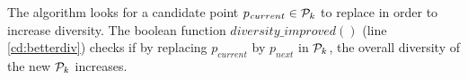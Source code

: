 \vspace{2pt}
The algorithm looks for a candidate point $p_{\mathit current} \in {\cal P}_k$ to replace in order to increase diversity. The boolean function $\mathit{diversity\_improved}()$ (line \ref{cd:betterdiv}) checks if by replacing $p_{current}$ by $p_{next}$ in ${\cal P}_k$, the overall diversity of the new ${\cal P}_k$ increases.





